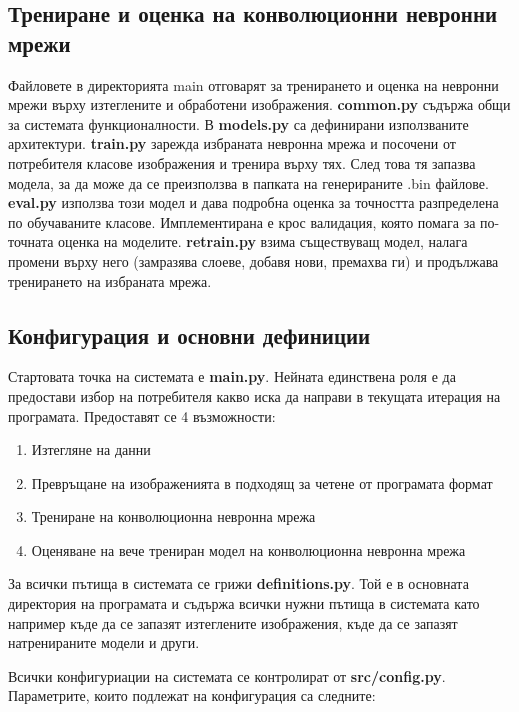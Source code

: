 \subsection{Трениране и оценка на конволюционни невронни мрежи}

Файловете в директорията main отговарят за тренирането и оценка на невронни мрежи върху изтеглените и обработени изображения. \textbf{common.py} съдържа общи за системата функционалности. В \textbf{models.py} са дефинирани използваните архитектури. \textbf{train.py} зарежда избраната невронна мрежа и посочени от потребителя класове изображения и тренира върху тях. След това тя запазва модела, за да може да се преизползва в папката на генерираните .bin файлове. \textbf{eval.py} използва този модел и дава подробна оценка за точността разпределена по обучаваните класове. Имплементирана е крос валидация, която помага за по-точната оценка на моделите. \textbf{retrain.py} взима съществуващ модел, налага промени върху него (замразява слоеве, добавя нови, премахва ги) и продължава тренирането на избраната мрежа.

\subsection{Конфигурация и основни дефиниции}

Стартовата точка на системата е \textbf{main.py}. Нейната единствена роля е да предостави избор на потребителя какво иска да направи в текущата итерация на програмата. Предоставят се 4 възможности:
\begin{enumerate}
\item Изтегляне на данни
\item Превръщане на изображенията в подходящ за четене от програмата формат
\item Трениране на конволюционна невронна мрежа
\item Оценяване на вече трениран модел на конволюционна невронна мрежа
\end{enumerate}

За всички пътища в системата се грижи \textbf{definitions.py}. Той е в основната директория на програмата и съдържа всички нужни пътища в системата като например къде да се запазят изтеглените изображения, къде да се запазят натренираните модели и други.

Всички конфигуриации на системата се контролират от \textbf{src/config.py}. Параметрите, които подлежат на конфигурация са следните:

